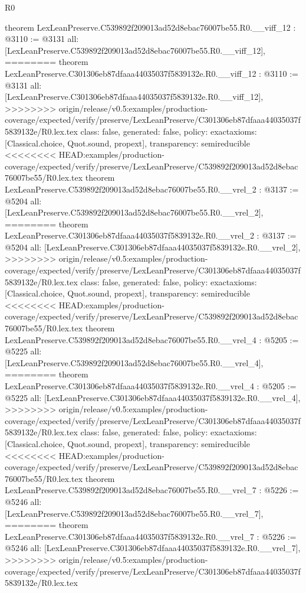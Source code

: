 \begin{lexlean}{R0}
\begin{coremodule}
{{{{{{{{{{{{{{{{{{{{{{{{{{{{{{{{{{{{{{{{{{{{{{{{{{{{{{{{{{{{{{{{{{theorem LexLeanPreserve.C539892f209013ad52d8ebac76007be55.R0.__viff_12 : @3110 := @3131 {
  all: [LexLeanPreserve.C539892f209013ad52d8ebac76007be55.R0.__viff_12],
========
theorem LexLeanPreserve.C301306eb87dfaaa44035037f5839132e.R0.__viff_12 : @3110 := @3131 {
  all: [LexLeanPreserve.C301306eb87dfaaa44035037f5839132e.R0.__viff_12],
>>>>>>>> origin/release/v0.5:examples/production-coverage/expected/verify/preserve/LexLeanPreserve/C301306eb87dfaaa44035037f5839132e/R0.lex.tex
  class: false,
  generated: false,
  policy: exact{axioms: [Classical.choice, Quot.sound, propext]},
  transparency: semireducible
}
<<<<<<<< HEAD:examples/production-coverage/expected/verify/preserve/LexLeanPreserve/C539892f209013ad52d8ebac76007be55/R0.lex.tex
theorem LexLeanPreserve.C539892f209013ad52d8ebac76007be55.R0.__vrel_2 : @3137 := @5204 {
  all: [LexLeanPreserve.C539892f209013ad52d8ebac76007be55.R0.__vrel_2],
========
theorem LexLeanPreserve.C301306eb87dfaaa44035037f5839132e.R0.__vrel_2 : @3137 := @5204 {
  all: [LexLeanPreserve.C301306eb87dfaaa44035037f5839132e.R0.__vrel_2],
>>>>>>>> origin/release/v0.5:examples/production-coverage/expected/verify/preserve/LexLeanPreserve/C301306eb87dfaaa44035037f5839132e/R0.lex.tex
  class: false,
  generated: false,
  policy: exact{axioms: [Classical.choice, Quot.sound, propext]},
  transparency: semireducible
}
<<<<<<<< HEAD:examples/production-coverage/expected/verify/preserve/LexLeanPreserve/C539892f209013ad52d8ebac76007be55/R0.lex.tex
theorem LexLeanPreserve.C539892f209013ad52d8ebac76007be55.R0.__vrel_4 : @5205 := @5225 {
  all: [LexLeanPreserve.C539892f209013ad52d8ebac76007be55.R0.__vrel_4],
========
theorem LexLeanPreserve.C301306eb87dfaaa44035037f5839132e.R0.__vrel_4 : @5205 := @5225 {
  all: [LexLeanPreserve.C301306eb87dfaaa44035037f5839132e.R0.__vrel_4],
>>>>>>>> origin/release/v0.5:examples/production-coverage/expected/verify/preserve/LexLeanPreserve/C301306eb87dfaaa44035037f5839132e/R0.lex.tex
  class: false,
  generated: false,
  policy: exact{axioms: [Classical.choice, Quot.sound, propext]},
  transparency: semireducible
}
<<<<<<<< HEAD:examples/production-coverage/expected/verify/preserve/LexLeanPreserve/C539892f209013ad52d8ebac76007be55/R0.lex.tex
theorem LexLeanPreserve.C539892f209013ad52d8ebac76007be55.R0.__vrel_7 : @5226 := @5246 {
  all: [LexLeanPreserve.C539892f209013ad52d8ebac76007be55.R0.__vrel_7],
========
theorem LexLeanPreserve.C301306eb87dfaaa44035037f5839132e.R0.__vrel_7 : @5226 := @5246 {
  all: [LexLeanPreserve.C301306eb87dfaaa44035037f5839132e.R0.__vrel_7],
>>>>>>>> origin/release/v0.5:examples/production-coverage/expected/verify/preserve/LexLeanPreserve/C301306eb87dfaaa44035037f5839132e/R0.lex.tex
}}}}}}}}}}}}}}}}}}}}}}}}}}}}}}}}}}}}}}}}}}}}}}}}}}}}}}}}}}}}}}}}}}}}}}}
\end{coremodule}
\end{lexlean}
